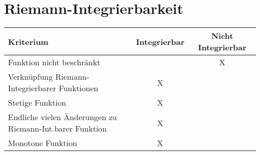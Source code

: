 \section{Riemann-Integrierbarkeit}
\begin{center}
    \begin{tabular}{lcc}
        \toprule
        Kriterium & Integrierbar & Nicht Integrierbar \\
        \midrule
        Funktion nicht beschränkt & & X \\
        Verknüpfung Riemann-Integrierbarer Funktionen & X \\
        Stetige Funktion & X\\
        Endliche vielen Änderungen zu Riemann-Int.barer Funktion & X\\
        Monotone Funktion & X\\
        \bottomrule
    \end{tabular}
\end{center}
